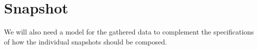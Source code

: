 
\section{Snapshot}
\label{sec:snapshot}

We will also need a model for the gathered data to complement the specifications of how the individual snapshots should be composed. 

